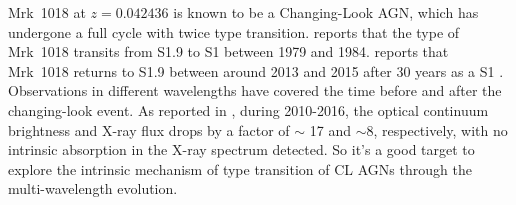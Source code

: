 \documentclass[twocolumn]{aastex63}
\begin{document}



Mrk~1018 at $z=0.042436$ is known to be a Changing-Look AGN, which has undergone a full cycle with twice type transition. \citet{1986ApJ...311..135C} reports that the type of Mrk~1018 transits from S1.9 to S1 between 1979 and 1984. \citet{2016A&A...593L...8M} reports that Mrk~1018 returns to S1.9 between around 2013 and 2015 after 30 years as a S1 \citep[see also][]{2017A&A...607L...9K}. %
Observations in different wavelengths have covered the time before and after the changing-look event. %
As reported in \citet{2016A&A...593L...9H}, during 2010-2016, the optical continuum brightness and X-ray flux drops by a factor of $\sim$ 17 and $\sim 8$, respectively, with no intrinsic absorption in the X-ray spectrum detected. So it's a good target to explore the intrinsic mechanism of type transition of CL AGNs through the multi-wavelength evolution.

\end{document}
